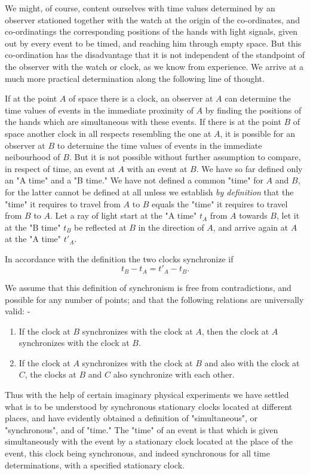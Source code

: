 We might, of course, content ourselves with time values determined by an observer stationed together with the watch at the origin of the co-ordinates, and co-ordinatings the corresponding positions of the hands with light signals, given out by every event to be timed, and reaching him through empty space. But this co-ordination has the disadvantage that it is not independent of the standpoint of the observer with the watch or clock, as we know from experience. We arrive at a much more practical determination along the following line of thought.

If at the point $A$ of space there is a clock, an observer at $A$ can determine the time values of events in the immediate proximity of $A$ by finding the positions of the hands which are simultaneous with these events. If there is at the point $B$ of space another clock in all respects resembling the one at $A$, it is possible for an observer at $B$ to determine the time values of events in the immediate neibourhood of $B$. But it is not possible without further assumption to compare, in respect of time, an event at $A$ with an event at $B$. We have so far defined only an "A time" and a "B time." We have not defined a common "time" for $A$ and $B$, for the latter cannot be defined at all unless we establish \textit{by definition} that the "time" it requires to travel from $A$ to $B$ equals the "time" it requires to travel from $B$ to $A$. Let a ray of light start at the "A time" $t_A$ from $A$ towards $B$, let it at the "B time" $t_B$ be reflected at $B$ in the direction of $A$, and arrive again at $A$ at the "A time" $t'_A$.  

In accordance with the definition the two clocks synchronize if
$$ t_B - t_A = t'_A - t_B. $$

We assume that this definition of synchronism is free from contradictions, and possible for any number of points; and that the following relations are universally valid: -
\begin{enumerate}
	\item If the clock at $B$ synchronizes with the clock at $A$, then the clock at $A$ synchronizes with the clock at $B$.
	\item If the clock at $A$ synchronizes with the clock at $B$ and also with the clock at $C$, the clocks at $B$ and $C$ also synchronize with each other.
\end{enumerate}

Thus with the help of certain imaginary physical experiments we have settled what is to be understood by synchronous stationary clocks located at different places, and have evidently obtained a definition of "simultaneous", or "synchronous", and of "time." The "time" of an event is that which is given simultaneously with the event by a stationary clock located at the place of the event, this clock being synchronous, and indeed synchronous for all time determinations, with a specified stationary clock.

